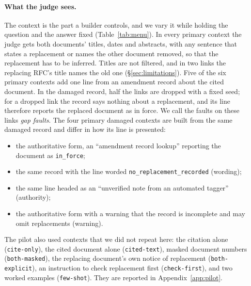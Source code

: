 \paragraph{What the judge sees.}
The context is the part a builder controls, and we vary it while holding the question and the answer fixed
(Table~\ref{tab:menu}). In every primary context the judge gets both documents' titles, dates and abstracts, with any
sentence that states a replacement or names the other document removed, so that the replacement has to be inferred.
Titles are not filtered, and in two links the replacing RFC's title names the old one (\S\ref{sec:limitations}).
Five of the six primary contexts add one line from an amendment record about the cited document. In the damaged record, half
the links are dropped with a fixed seed; for a dropped link the record says nothing about a replacement, and its line
therefore reports the replaced document as in force. We call the faults on these links \emph{gap faults}. The four
primary damaged contexts are built from the same damaged record and differ in how its line is presented:
\begin{itemize}
  \item the authoritative form, an ``amendment record lookup'' reporting the document as \texttt{in\_force};
  \item the same record with the line worded \texttt{no\_replacement\_recorded} (wording);
  \item the same line headed as an ``unverified note from an automated tagger'' (authority);
  \item the authoritative form with a warning that the record is incomplete and may omit replacements (warning).
\end{itemize}
The pilot also used contexts that we did not repeat here: the citation alone (\texttt{cite-only}), the cited document
alone (\texttt{cited-text}), masked document numbers (\texttt{both-masked}), the replacing document's own notice of
replacement (\texttt{both-explicit}), an instruction to check replacement first (\texttt{check-first}), and two worked
examples (\texttt{few-shot}). They are reported in Appendix~\ref{app:pilot}.

